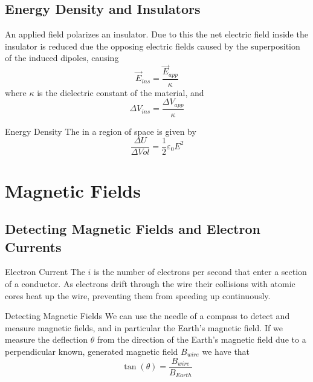 \documentclass[12pt]{report}
\begin{document}
\section{Energy Density and Insulators}

\begin{defn}{}{}
        An applied field polarizes an insulator. Due to this the net electric field inside the insulator is reduced due the opposing electric fields caused by the superposition of the induced dipoles, causing \begin{equation}
                \vec{E}_{ins} = \frac{\vec{E}_{app}}{\kappa}
        \end{equation}
        where $\kappa$ is the dielectric constant of the material, and \begin{equation}
                \Delta V_{ins} = \frac{\Delta V_{app}}{\kappa}
        \end{equation}
\end{defn}

\begin{defn}{Energy Density}{}
        The  in a region of space is given by \begin{equation}
                \frac{\Delta U}{\Delta Vol} = \frac{1}{2}\varepsilon_0 E^2
        \end{equation}
\end{defn}








\chapter{Magnetic Fields}


\section{Detecting Magnetic Fields and Electron Currents}

\begin{defn}{Electron Current}{}
        The  $i$ is the number of electrons per second that enter a section of a conductor. As electrons drift through the wire their collisions with atomic cores heat up the wire, preventing them from speeding up continuously. 
\end{defn}

\begin{defn}{Detecting Magnetic Fields}{}
        We can use the needle of a compass to detect and measure magnetic fields, and in particular the Earth's magnetic field. If we measure the deflection $\theta$ from the direction of the Earth's magnetic field due to a perpendicular known, generated magnetic field $B_{wire}$ we have that \begin{equation}
                \tan(\theta) = \frac{B_{wire}}{B_{Earth}}
        \end{equation}
\end{defn}
\end{document}
